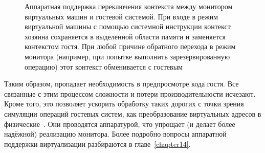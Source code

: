 \begin{figure}[htb]
    \centering
    \caption[Аппаратная поддержка переключения контекста между монитором виртуальных машин и гостевой системой]{Аппаратная поддержка переключения контекста между монитором виртуальных машин и гостевой системой. При входе в режим виртуальной машины с помощью системной инструкции контекст хозяина сохраняется в выделенной области памяти и заменяется контекстом гостя. При любой причине обратного перехода в режим монитора (например, при попытке выполнить зарезервированную операцию) этот контекст обменивается с гостевым}
    \label{fig:vm-assist}
\end{figure}

Таким образом, пропадает необходимость в предпросмотре кода гостя. Все связанные с этим процессом сложности и потери производительности исчезают. Кроме того, это позволяет ускорить обработку таких дорогих с точки зрения симуляции операций гостевых систем, как преобразование виртуальных адресов в физические~\cite{ulrich-virt-cost}. Они проводятся аппаратурой, что упрощает (и делает более надёжной) реализацию монитора.  Более подробно вопросы аппаратной поддержки виртуализации разбираются в главе~\ref{chapter14}.

